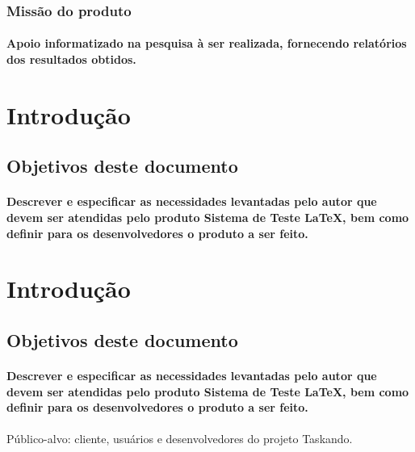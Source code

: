 \documentclass{article}
\begin{document}
		\subsubsection{Missão do produto}
			\paragraph{Apoio informatizado na pesquisa à ser realizada, fornecendo relatórios dos resultados obtidos.}
			

\newpage

\section{Introdução}
	\subsection{Objetivos deste documento}
		\paragraph{Descrever e especificar as necessidades levantadas pelo autor que devem ser atendidas pelo produto Sistema de Teste LaTeX, bem como definir para os desenvolvedores o produto a ser feito.}

\newpage

\section{Introdução}
	\subsection{Objetivos deste documento}
		\paragraph{Descrever e especificar as necessidades levantadas pelo autor que devem ser atendidas pelo produto Sistema de Teste LaTeX, bem como definir para os desenvolvedores o produto a ser feito.}

\paragraph{}Público-alvo: cliente, usuários e desenvolvedores do projeto Taskando.
\end{document}
